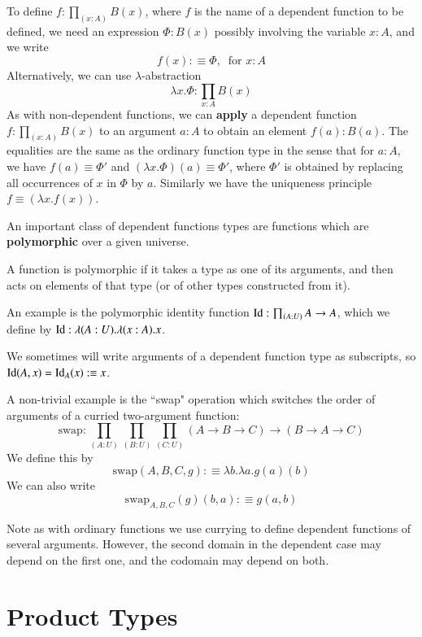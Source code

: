To define $f:\prod_{(x:A)}B(x)$, where $f$ is the name of a dependent function to be defined, we need an expression $\Phi:B(x)$ possibly involving the variable $x:A$, and we write $$f(x) :\equiv \Phi,\;\;\text{for }x:A$$
Alternatively, we can use $\lambda$-abstraction $$\lambda x.\Phi:\prod_{x:A}B(x)$$
As with non-dependent functions, we can \textbf{apply} a dependent function $f:\prod_{(x:A)}B(x)$ to an argument $a :A$ to obtain an element $f(a):B(a)$. The equalities are the same as the ordinary function type in the sense that for $a:A$, we have $f(a) \equiv \Phi'$ and $(\lambda x.\Phi)(a) \equiv \Phi'$, where $\Phi'$ is obtained by replacing all occurrences of $x$ in $\Phi$ by $a$. Similarly we have the uniqueness principle $f \equiv (\lambda x.f(x))$.

An important class of dependent functions types are functions which are \textbf{polymorphic} over a given universe.

\begin{definition}
    A function is polymorphic if it takes a type as one of its arguments, and then acts on elements of that type (or of other types constructed from it).
\end{definition}
An example is the polymorphic identity function $\operatorname{Id}:\prod_{(A:U)}A\rightarrow A$, which we define by $\operatorname{Id} :\lambda(A:U).\lambda(x:A).x$.

We sometimes will write arguments of a dependent function type as subscripts, so $\operatorname{Id}(A,x) = \operatorname{Id}_A(x) :\equiv x$.

\begin{example}
    A non-trivial example is the ``swap" operation which switches the order of arguments of a curried two-argument function: $$\text{swap}:\prod_{(A:U)}\prod_{(B:U)}\prod_{(C:U)}(A\rightarrow B\rightarrow C)\rightarrow (B\rightarrow A\rightarrow C)$$
    We define this by \begin{equation*}
        \text{swap}(A,B,C,g) :\equiv \lambda b.\lambda a.g(a)(b)
    \end{equation*}
    We can also write $$\text{swap}_{A,B,C}(g)(b,a) :\equiv g(a,b)$$
\end{example}

Note as with ordinary functions we use currying to define dependent functions of several arguments. However, the second domain in the dependent case may depend on the first one, and the codomain may depend on both.

\section{Product Types}

